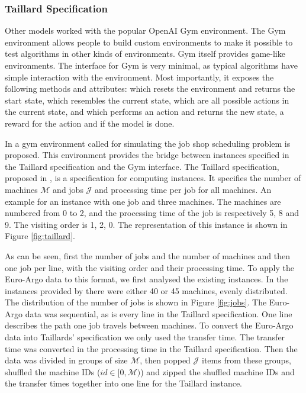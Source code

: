 


\subsubsection{Taillard Specification}\label{sec:taillard}

Other models worked with the popular OpenAI Gym environment. The Gym
environment allows people to build custom environments to make it possible to
test \rl algorithms in other kinds of environments. Gym itself provides
game-like environments. The interface for Gym is very minimal, as typical \rl
algorithms have simple interaction with the environment. Most importantly, it
exposes the following methods and attributes:  which resets
the environment and returns the start state, 
which resembles the current state,  which are all
possible actions in the current state, and  which
performs an action and returns the new state, a reward for the action and if
the model is done.

In  a gym environment called  for simulating
the job shop scheduling problem is proposed. This environment provides the
bridge between instances specified in the Taillard specification and the Gym
interface. The Taillard specification, proposed in , is a
specification for computing instances. It specifies the number of machines
$\mathcal{M}$ and jobs $\mathcal{J}$ and processing time per job for all
machines. An example for an instance with one job and three machines. The
machines are numbered from 0 to 2, and the processing time of the job is
respectively 5, 8 and 9. The visiting order is 1, 2, 0. The representation of
this instance is shown in Figure \ref{fig:taillard}.



As can be seen, first the number of jobs and the number of machines and then
one job per line, with the visiting order and their processing time. To apply
the Euro-Argo data to this format, we first analysed the existing instances.
In the instances provided by  there were either 40 or 45
machines, evenly distributed. The distribution of the number of jobs is shown
in Figure \ref{fig:jobs}. The Euro-Argo data was sequential, as is every line
in the Taillard specification. One line describes the path one job travels
between machines. To convert the Euro-Argo data into Taillards' specification
we only used the transfer time. The transfer time was converted in the
processing time in the Taillard specification. Then the data was divided in
groups of size $\mathcal{M}$, then popped $\mathcal{J}$ items from these
groups, shuffled the machine IDs ($id \in [0, \mathcal{M})$) and zipped the
shuffled machine IDs and the transfer times together into one line for the
Taillard instance.


